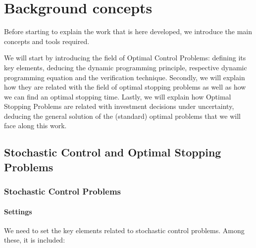 
\chapter{Background concepts}
\label{chapter:bc}

Before starting to explain the work that is here developed, we introduce the main concepts and tools required.

We will start by introducing the field of Optimal Control Problems: defining its key elements, deducing the dynamic programming principle, respective dynamic programming equation and the verification technique. Secondly, we will explain how they are related with the field of optimal stopping problems as well as how we can find an optimal stopping time. Lastly, we will explain how Optimal Stopping Problems are related with investment decisions under uncertainty, deducing the general solution of the (standard) optimal problems that we will face along this work.


\section{Stochastic Control and Optimal Stopping Problems}
\label{section:scop}	

\subsection{Stochastic Control Problems}
\label{section:control}

\subsubsection{Settings}

We need to set the key elements related to stochastic control problems. Among these, it is included:

